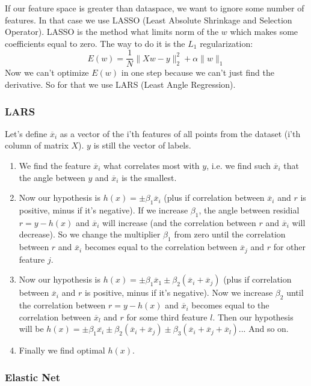 If our feature space is greater than dataspace, we want to ignore some number of features. In that case we use LASSO (Least Absolute Shrinkage and Selection Operator). LASSO is the method what limits norm of the $w$ which makes some coefficients equal to zero. The way to do it is the $L_1$ regularization:
$$E(w)=\frac{1}{N}\|Xw-y\|_2^2+\alpha\|w\|_1$$
Now we can't optimize $E(w)$ in one step because we can't just find the derivative. So for that we use LARS (Least Angle Regression).

\subsubsection*{LARS}

Let's define $\overline{x}_i$ as a vector of the i'th features of all points from the dataset (i'th column of matrix $X$). $y$ is still the vector of labels.
\begin{enumerate}
	\item We find the feature $\overline{x}_i$ what correlates most with $y$, i.e. we find such $\overline{x}_i$ that the angle between $y$ and $\overline{x}_i$ is the smallest.
	\item Now our hypothesis is $h(x)=\pm\beta_1\overline{x}_i$ (plus if correlation between $\overline{x}_i$ and $r$ is positive, minus if it's negative). If we increase $\beta_1$, the angle between residial $r=y-h(x)$ and $\overline{x}_i$ will increase (and  the correlation between $r$ and $\overline{x}_i$ will decrease). So we change the multiplier $\beta_1$ from zero until the correlation between $r$ and $\overline{x}_i$ becomes equal to the correlation between $\overline{x}_j$ and $r$ for other feature $j$.
	\item Now our hypothesis is $h(x)=\pm\beta_1\overline{x}_1\pm\beta_2(\overline{x}_i+\overline{x}_j)$ (plus if correlation between $\overline{x}_i$ and $r$ is positive, minus if it's negative). Now we increase $\beta_2$ until the correlation between $r=y-h(x)$ and $\overline{x}_i$ becomes equal to the correlation between $\overline{x}_l$ and $r$ for some third feature $l$. Then our hypothesis will be $h(x)=\pm\beta_1\overline{x_i}\pm\beta_2(\overline{x}_i+\overline{x}_j)\pm\beta_3(\overline{x}_i+\overline{x}_j+\overline{x}_l)$... And so on.
	\item Finally we find optimal $h(x)$.
\end{enumerate}

\subsubsection*{Elastic Net}

